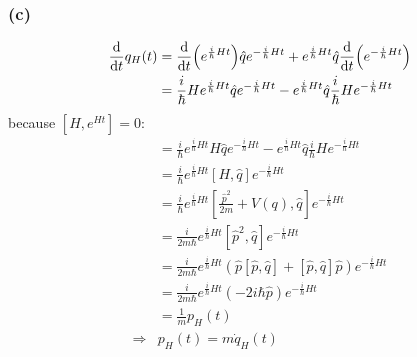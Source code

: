 \documentclass{article}
\begin{document}
\subsubsection*{(c)}
\begin{equation*}
    \begin{split}
        \dv{t}q_H(t) & =\dv{t}(e^{\frac{i}{\hbar}Ht})\hat qe^{-\frac{i}{\hbar}Ht}+e^{\frac{i}{\hbar}Ht}\hat q\dv{t}(e^{-\frac{i}{\hbar}Ht})\\
        & = \frac{i}{\hbar}He^{\frac{i}{\hbar}Ht}\hat qe^{-\frac{i}{\hbar}Ht}-e^{\frac{i}{\hbar}Ht}\hat q\frac{i}{\hbar}He^{-\frac{i}{\hbar}Ht}\\
    \end{split}
\end{equation*}
because $[H,e^{Ht}]=0$:
\begin{equation*}
    \begin{split}
        & = \frac{i}{\hbar}e^{\frac{i}{\hbar}Ht} H\hat qe^{-\frac{i}{\hbar}Ht}-e^{\frac{i}{\hbar}Ht}\hat q\frac{i}{\hbar}He^{-\frac{i}{\hbar}Ht}\\
        & = \frac{i}{\hbar}e^{\frac{i}{\hbar}Ht}[H,\hat q]e^{-\frac{i}{\hbar}Ht}\\
        & = \frac{i}{\hbar}e^{\frac{i}{\hbar}Ht}[\frac{\hat{p}^2}{2m}+V(q),\hat q]e^{-\frac{i}{\hbar}Ht}\\
        & = \frac{i}{2m\hbar}e^{\frac{i}{\hbar}Ht}[\hat{p}^2,\hat q]e^{-\frac{i}{\hbar}Ht}\\
        & = \frac{i}{2m\hbar}e^{\frac{i}{\hbar}Ht}(\hat p[\hat p,\hat q]+[\hat p,\hat q]\hat p)e^{-\frac{i}{\hbar}Ht}\\
        & = \frac{i}{2m\hbar}e^{\frac{i}{\hbar}Ht}(-2i\hbar \hat p)e^{-\frac{i}{\hbar}Ht}\\
        & = \frac{1}{m}p_H(t)\\
        \Rightarrow & p_H(t)=m\dot{q}_H(t)
    \end{split}
\end{equation*}
\end{document}
